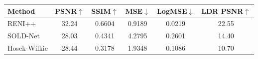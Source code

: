\begin{tabular}{l|ccccc}
\hline
Method & PSNR$\uparrow$ & SSIM$\uparrow$ & MSE$\downarrow$ & LogMSE$\downarrow$ & LDR PSNR$\uparrow$ \\
\hline
RENI++ & 32.24 & 0.6604 & 0.9189 & 0.0219 & 22.55 \\
SOLD-Net & 28.03 & 0.4341 & 4.2795 & 0.2601 & 14.40 \\
Hosek-Wilkie & 28.44 & 0.3178 & 1.9348 & 0.1086 & 10.70 \\
\hline
\end{tabular}
